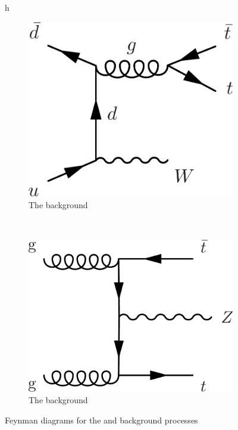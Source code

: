 \begin{figure}{h}
    \centering
    \begin{subfigure}[h]{0.4\textwidth}
        \includegraphics[width=\textwidth]{Figures/Feynman_Diagrams/backgrounds__ttbar_plus_W.pdf}
        \caption{The \ttW background}\label{fd:ttW}
      \end{subfigure}
      ~ %
      \begin{subfigure}[h]{0.4\textwidth}
        \includegraphics[width=\textwidth]{Figures/Feynman_Diagrams/backgrounds__ttbar_plus_Z.pdf}
        \caption{The \ttZ background}\label{fd:ttZ}
      \end{subfigure}
      \caption{Feynman diagrams for the \ttW and \ttZ background processes} \label{fig:feynman_diagrams__ttW_ttZ}
\end{figure}

